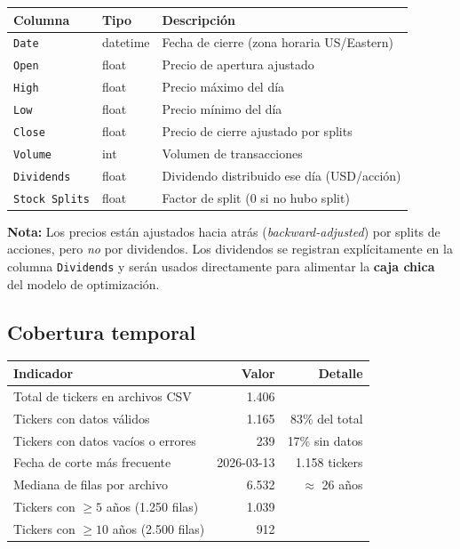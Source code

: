 \begin{center}
\begin{tabular}{lll}
  \toprule
  \textbf{Columna} & \textbf{Tipo} & \textbf{Descripción} \\
  \midrule
  \texttt{Date}         & datetime & Fecha de cierre (zona horaria US/Eastern) \\
  \texttt{Open}         & float    & Precio de apertura ajustado \\
  \texttt{High}         & float    & Precio máximo del día \\
  \texttt{Low}          & float    & Precio mínimo del día \\
  \texttt{Close}        & float    & Precio de cierre ajustado por splits \\
  \texttt{Volume}       & int      & Volumen de transacciones \\
  \texttt{Dividends}    & float    & Dividendo distribuido ese día (USD/acción) \\
  \texttt{Stock Splits} & float    & Factor de split (0 si no hubo split) \\
  \bottomrule
\end{tabular}
\end{center}

\noindent\textbf{Nota:} Los precios están ajustados hacia atrás
(\emph{backward-adjusted}) por splits de acciones, pero \emph{no} por
dividendos. Los dividendos se registran explícitamente en la columna
\texttt{Dividends} y serán usados directamente para alimentar la
\textbf{caja chica} del modelo de optimización.

\subsection*{Cobertura temporal}

\begin{center}
\begin{tabular}{lrr}
  \toprule
  \textbf{Indicador} & \textbf{Valor} & \textbf{Detalle} \\
  \midrule
  Total de tickers en archivos CSV         & 1.406      &              \\
  Tickers con datos válidos                & 1.165      & 83\% del total \\
  Tickers con datos vacíos o errores       & 239        & 17\% sin datos \\
  Fecha de corte más frecuente             & 2026-03-13 & 1.158 tickers  \\
  Mediana de filas por archivo             & 6.532      & $\approx$ 26 años \\
  \midrule
  Tickers con $\geq 5$ años (1.250 filas)  & 1.039      & \\
  Tickers con $\geq 10$ años (2.500 filas) & 912        & \\
  \bottomrule
\end{tabular}
\end{center}

